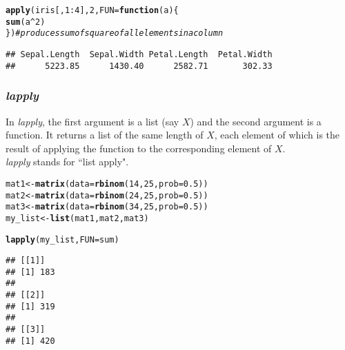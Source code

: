 \documentclass[11pt, a4paper]{article}\usepackage[]{graphicx}\usepackage[]{xcolor}
\makeatletter
\newcommand{\hlnum}[1]{\textcolor[rgb]{0.686,0.059,0.569}{#1}}%
\newcommand{\hlcom}[1]{\textcolor[rgb]{0.678,0.584,0.686}{\textit{#1}}}%
\newcommand{\hlopt}[1]{\textcolor[rgb]{0,0,0}{#1}}%
\newcommand{\hldef}[1]{\textcolor[rgb]{0.345,0.345,0.345}{#1}}%
\newcommand{\hlkwa}[1]{\textcolor[rgb]{0.161,0.373,0.58}{\textbf{#1}}}%
\newcommand{\hlkwb}[1]{\textcolor[rgb]{0.69,0.353,0.396}{#1}}%
\newcommand{\hlkwc}[1]{\textcolor[rgb]{0.333,0.667,0.333}{#1}}%
\newcommand{\hlkwd}[1]{\textcolor[rgb]{0.737,0.353,0.396}{\textbf{#1}}}%
\newenvironment{kframe}{%
 \def\at@end@of@kframe{}%
 \ifinner\ifhmode%
  \def\at@end@of@kframe{\end{minipage}}%
  \begin{minipage}{\columnwidth}%
 \fi\fi%
 \def\FrameCommand##1{\hskip\@totalleftmargin \hskip-\fboxsep
 \colorbox{shadecolor}{##1}\hskip-\fboxsep
     \hskip-\linewidth \hskip-\@totalleftmargin \hskip\columnwidth}%
 \MakeFramed {\advance\hsize-\width
   \@totalleftmargin\z@ \linewidth\hsize
   \@setminipage}}%
 {\par\unskip\endMakeFramed%
 \at@end@of@kframe}
\newenvironment{knitrout}{}{} %
\makeatother
\begin{document}
\begin{knitrout}
\color{fgcolor}\begin{kframe}
\begin{alltt}
\hlkwd{apply}\hldef{(iris[,} \hlnum{1}\hlopt{:}\hlnum{4}\hldef{],} \hlnum{2}\hldef{,} \hlkwc{FUN} \hldef{=} \hlkwa{function}\hldef{(}\hlkwc{a}\hldef{) \{}
    \hlkwd{sum}\hldef{(a}\hlopt{^}\hlnum{2}\hldef{)}
\hldef{\})}  \hlcom{# produces sum of square of all elements in a column}
\end{alltt}
\begin{verbatim}
## Sepal.Length  Sepal.Width Petal.Length  Petal.Width 
##      5223.85      1430.40      2582.71       302.33
\end{verbatim}
\end{kframe}
\end{knitrout}

\subsubsection{\textit{lapply}} In \textit{lapply}, the first argument is a list (say $X$) and the second argument is a function. It returns a list of the same length of $X$, each element of which is the result of applying the function to the corresponding element of $X$. \\

\textit{lapply} stands for ``list apply".

\begin{knitrout}
\color{fgcolor}\begin{kframe}
\begin{alltt}
\hldef{mat1} \hlkwb{<-} \hlkwd{matrix}\hldef{(}\hlkwc{data} \hldef{=} \hlkwd{rbinom}\hldef{(}\hlnum{14}\hldef{,} \hlnum{25}\hldef{,} \hlkwc{prob} \hldef{=} \hlnum{0.5}\hldef{))}
\hldef{mat2} \hlkwb{<-} \hlkwd{matrix}\hldef{(}\hlkwc{data} \hldef{=} \hlkwd{rbinom}\hldef{(}\hlnum{24}\hldef{,} \hlnum{25}\hldef{,} \hlkwc{prob} \hldef{=} \hlnum{0.5}\hldef{))}
\hldef{mat3} \hlkwb{<-} \hlkwd{matrix}\hldef{(}\hlkwc{data} \hldef{=} \hlkwd{rbinom}\hldef{(}\hlnum{34}\hldef{,} \hlnum{25}\hldef{,} \hlkwc{prob} \hldef{=} \hlnum{0.5}\hldef{))}
\hldef{my_list} \hlkwb{<-} \hlkwd{list}\hldef{(mat1, mat2, mat3)}

\hlkwd{lapply}\hldef{(my_list,} \hlkwc{FUN} \hldef{= sum)}
\end{alltt}
\begin{verbatim}
## [[1]]
## [1] 183
## 
## [[2]]
## [1] 319
## 
## [[3]]
## [1] 420
\end{verbatim}
\end{kframe}
\end{knitrout}
\end{document}
